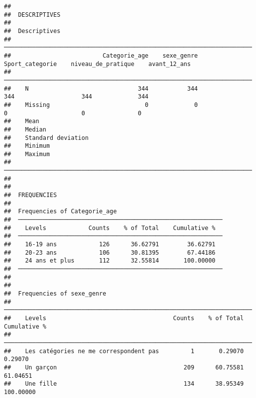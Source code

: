\documentclass[
]{article}
\begin{document}
\begin{verbatim}
## 
##  DESCRIPTIVES
## 
##  Descriptives                                                                                                   
##  ────────────────────────────────────────────────────────────────────────────────────────────────────────────── 
##                          Categorie_age    sexe_genre    Sport_categorie    niveau_de_pratique    avant_12_ans   
##  ────────────────────────────────────────────────────────────────────────────────────────────────────────────── 
##    N                               344           344                344                   344             344   
##    Missing                           0             0                  0                     0               0   
##    Mean                                                                                                         
##    Median                                                                                                       
##    Standard deviation                                                                                           
##    Minimum                                                                                                      
##    Maximum                                                                                                      
##  ────────────────────────────────────────────────────────────────────────────────────────────────────────────── 
## 
## 
##  FREQUENCIES
## 
##  Frequencies of Categorie_age                               
##  ────────────────────────────────────────────────────────── 
##    Levels            Counts    % of Total    Cumulative %   
##  ────────────────────────────────────────────────────────── 
##    16-19 ans            126      36.62791        36.62791   
##    20-23 ans            106      30.81395        67.44186   
##    24 ans et plus       112      32.55814       100.00000   
##  ────────────────────────────────────────────────────────── 
## 
## 
##  Frequencies of sexe_genre                                                          
##  ────────────────────────────────────────────────────────────────────────────────── 
##    Levels                                    Counts    % of Total    Cumulative %   
##  ────────────────────────────────────────────────────────────────────────────────── 
##    Les catégories ne me correspondent pas         1       0.29070         0.29070   
##    Un garçon                                    209      60.75581        61.04651   
##    Une fille                                    134      38.95349       100.00000   

\end{verbatim}
\end{document}

